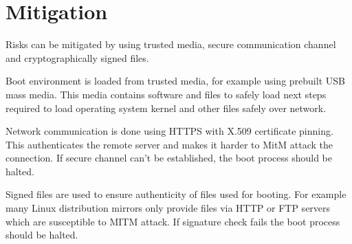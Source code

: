 \section{Mitigation}

Risks can be mitigated by using trusted media, secure communication
channel and cryptographically signed files.

Boot environment is loaded from trusted media, for example using
prebuilt USB mass media. This media contains software and files to
safely load next steps required to load operating system kernel and
other files safely over network.

Network communication is done using HTTPS with X.509 certificate
pinning. This authenticates the remote server and makes it harder to
MitM attack the connection. If secure channel can't be established,
the boot process should be halted.

Signed files are used to ensure authenticity of files used for
booting. For example many Linux distribution mirrors only provide
files via HTTP or FTP servers which are susceptible to MITM attack. If
signature check fails the boot process should be halted.
